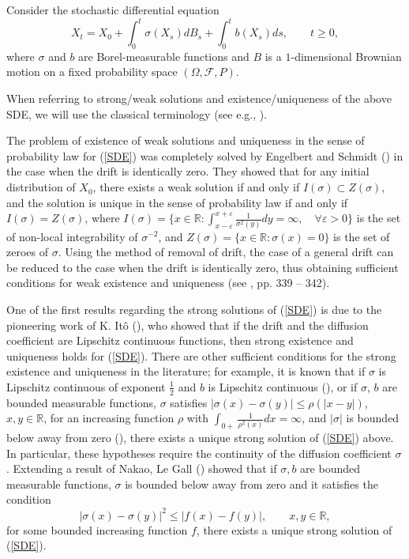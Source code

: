 \documentclass[reqno]{amsart}
\theoremstyle{definition}
\theoremstyle{remark}
\numberwithin{equation}{section}
\begin{document}
Consider the stochastic differential equation\begin{equation}
X_{t}=X_{0}+\int_{0}^{t}\sigma \left( X_{s}\right)
dB_{s}+\int_{0}^{t}b\left( X_{s}\right) ds,\qquad t\geq 0,  \label{SDE}
\end{equation}
where $\sigma$ and $b$ are Borel-measurable functions and $B$ is a $1$-dimensional Brownian motion on a fixed probability space $(\Omega,\mathcal{F},P)$.




When referring to strong/weak solutions and existence/uniqueness of the
above SDE, we will use the classical terminology (see e.g., \cite{Karatzas-Shreve}).

The problem of existence of weak solutions and uniqueness in the sense of proba\-bility law for (\ref{SDE}) was completely solved by Engelbert and Schmidt (\cite{Engelbert-Schmidt '85}) in the case when the drift is identically zero. They showed that for any initial distribution of $X_0$, there exists a weak solution if and only if $I(\sigma)\subset Z(\sigma)$, and the solution is unique in the sense of probability law if and only if  $I(\sigma)=Z(\sigma)$, where $I(\sigma)=\{x\in \mathbb{R}: \int_{x-\varepsilon}^{x+\varepsilon} \frac{1}{\sigma^2(y)} dy =\infty,\quad \forall \varepsilon >0\}$ is the set of non-local integrability of $\sigma^{-2}$, and $Z(\sigma)=\{x\in \mathbb{R}: \sigma(x)=0\}$ is the set of zeroes of $\sigma$. Using the method of removal of drift, the case of a general drift can be reduced to the case when the drift is identically zero, thus obtaining sufficient conditions for weak existence and uniqueness (see \cite{Karatzas-Shreve}, pp. 339 -- 342).

One of the first results regarding the strong solutions of (\ref{SDE}) is due to the pioneering work of K. It\^{o} (\cite{Ito '46}), who showed that if the drift and the diffusion coefficient are Lipschitz  continuous functions, then strong existence and uniqueness holds for (\ref{SDE}). There are other sufficient conditions for the strong existence and uniqueness in the literature; for example, it is known that if $\sigma $ is Lipschitz continu\-ous of exponent $\frac{1}{2}$ and $b$ is Lipschitz continuous (\cite{Yamada-Watanabe}), or if $\sigma$, $b$ are bounded measurable functions, $\sigma $ satisfies $\vert \sigma(x)-\sigma(y)\vert \le \rho(\vert x-y \vert )$, $x,y\in\mathbb{R}$, for an increasing function $\rho$ with $\int_{0+}\frac{1}{\rho^2(x)} dx =\infty$, and $\vert \sigma \vert$ is bounded below away from zero (\cite{Le Gall}), there exists a unique strong solution of (\ref{SDE}) above. In particular, these hypotheses require the continuity of the diffusion coefficient $\sigma $. Extending a result of Nakao, Le Gall (\cite{Le Gall}) showed that if $\sigma, b$ are bounded measurable functions, $\sigma $ is bounded below away from zero and it satisfies the condition
\begin{equation}\label{Nakao condition}
\left\vert \sigma \left( x\right) -\sigma \left( y\right) \right\vert
^{2}\leq \left\vert f\left( x\right) -f\left( y\right) \right\vert ,\qquad
x,y\in \mathbb{R},  
\end{equation}for some bounded increasing function $f$, there exists a unique strong solution of (\ref{SDE}).
\end{document}
